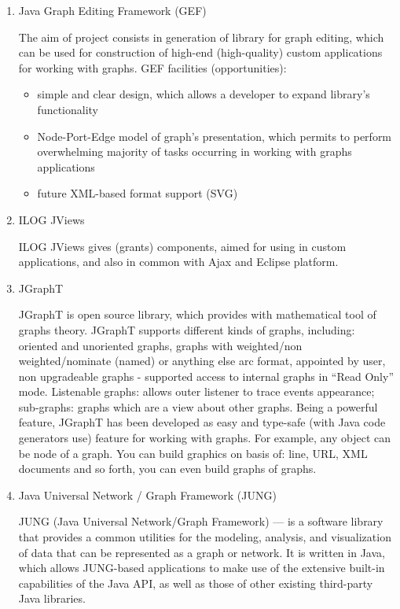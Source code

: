 \begin{enumerate}

\item
Java Graph Editing Framework (GEF)~\cite{GEF}

The aim of project consists in generation of library for graph editing, which can be used for construction of high-end (high-quality) custom applications for working with graphs.
GEF facilities (opportunities):
\begin{itemize}
	\item simple and clear design, which allows a developer to expand library's functionality
	\item Node-Port-Edge model of graph's presentation, which permits to perform overwhelming majority of tasks occurring in working with graphs applications
	\item future XML-based format support (SVG)
\end{itemize}

\item
ILOG JViews~\cite{ILOG_Jview}

ILOG JViews gives (grants) components, aimed for using in custom applications, and also in common with Ajax and Eclipse platform.

\item
JGraphT~\cite{JGraphT}

JGraphT is open source library, which provides with mathematical tool of graphs theory. JGraphT supports different kinds of graphs, including: oriented and unoriented graphs, graphs with weighted/non weighted/nominate (named) or anything else arc format, appointed 	by user, non upgradeable graphs - supported access to internal graphs in ``Read Only'' mode. Listenable graphs: allows outer listener to trace events appearance; sub-graphs: graphs which are a view about other graphs. Being a powerful feature, JGraphT has been 	developed as easy and type-safe (with Java code generators use) feature for working with 	graphs. For example, any object can be node of a graph. You can build graphics on basis of: line, URL, XML documents and so forth, you can even build graphs of graphs.

\item
Java Universal Network / Graph Framework (JUNG)~\cite{JUNG}

JUNG (Java Universal Network/Graph Framework) --- is a software library that provides a common utilities for the modeling, analysis, and visualization of data that can be represented as a graph or network. It is written in Java, which allows JUNG-based applications to make use of the extensive built-in capabilities of the Java API, as well as those of other existing third-party Java libraries.


\end{enumerate}
